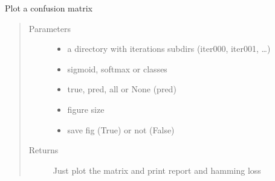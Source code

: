 \documentclass[letterpaper,10pt,english]{sphinxmanual}
\begin{document}
\begin{fulllineitems}
\label{\detokenize{PyTerK:pyterk.reporter.plot_confusion}}
\sphinxAtStartPar
Plot a confusion matrix
\begin{quote}\begin{description}
\item[{Parameters}] \leavevmode\begin{itemize}
\item {} 
\sphinxAtStartPar
{} \textendash{} a directory with iterations subdirs (iter\sphinxhyphen{}000, iter\sphinxhyphen{}001, …)

\item {} 
\sphinxAtStartPar
{} \textendash{} sigmoid, softmax or classes

\item {} 
\sphinxAtStartPar
{} \textendash{} true, pred, all or None (pred)

\item {} 
\sphinxAtStartPar
{} \textendash{} figure size

\item {} 
\sphinxAtStartPar
{} \textendash{} save fig (True) or not (False)

\end{itemize}

\item[{Returns}] \leavevmode
\sphinxAtStartPar
Just plot the matrix and print report and hamming loss

\end{description}\end{quote}

\end{fulllineitems}
\end{document}
